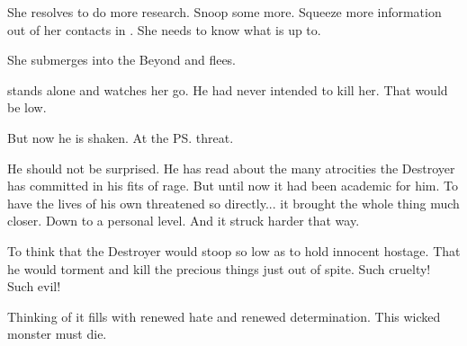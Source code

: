 She resolves to do more research. 
Snoop some more. 
Squeeze more information out of her contacts in \Nyx. 
She needs to know what \Teshrial is up to. 

She submerges into the Beyond and flees. 





\begin{comment}
  \section{\Teshrial thinks}
\end{comment}
\Teshrial stands alone and watches her go. 
He had never intended to kill her. 
That would be low. 

But now he is shaken. 
At the \ps{\scatha} threat. 

He should not be surprised. 
He has read about the many atrocities the Destroyer has committed in his fits of rage. 
But until now it had been academic for him. 
To have the lives of his own \humans threatened so directly... it brought the whole thing much closer. 
Down to a personal level. 
And it struck harder that way. 

To think that the Destroyer would stoop so low as to hold innocent \humans hostage. 
That he would torment and kill the precious things just out of spite. 
Such cruelty!
Such evil! 

Thinking of it fills \Teshrial with renewed hate and renewed determination. 
This wicked monster must die. 







